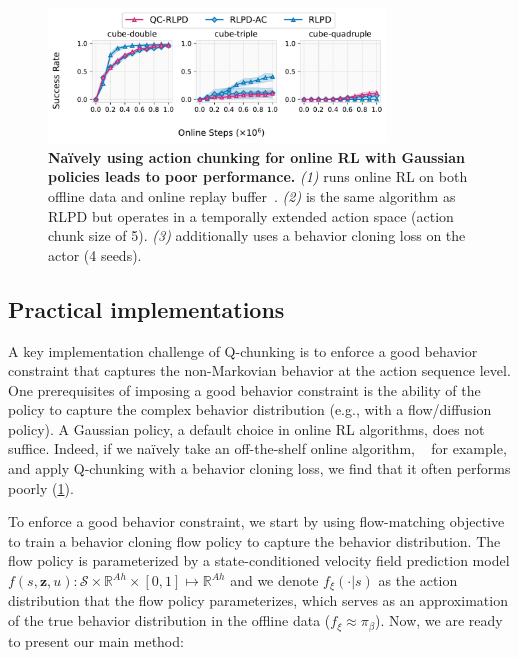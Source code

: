 \begin{figure}[t]
\centering
\includegraphics[width=0.8\textwidth]{figures/rlpd-qc-all.pdf}  %
\vspace{-0.7em}
\caption{\footnotesize \textbf{Na\"ively using action chunking for online RL with Gaussian policies leads to poor performance.} \emph{(1)}  runs online RL on both offline data and online replay buffer~\citep{ball2023efficient}. \emph{(2)}  is the same algorithm as RLPD but operates in a temporally extended action space (action chunk size of 5). \emph{(3)}  additionally uses a behavior cloning loss on the actor (4 seeds). }
\vspace{-1em}
\label{fig:rlpd-all}
\end{figure}

\subsection{Practical implementations}
A key implementation challenge of Q-chunking is to enforce a good behavior constraint that captures the non-Markovian behavior at the action sequence level. One prerequisites of imposing a good behavior constraint is the ability of the policy to capture the complex behavior distribution (e.g., with a flow/diffusion policy). A Gaussian policy, a default choice in online RL algorithms, does not suffice. Indeed, if we na\"ively take an off-the-shelf online algorithm, ~\citep{ball2023efficient} for example, and apply Q-chunking with a behavior cloning loss, we find that it often performs poorly (\cref{fig:rlpd-all}). 

To enforce a good behavior constraint, we start by using flow-matching objective~\citep{liu2022flow} to train a behavior cloning flow policy to capture the behavior distribution. The flow policy is parameterized by a state-conditioned velocity field prediction model $f(s, \mathbf z, u): \mathcal{S} \times \mathbb{R}^{Ah} \times [0, 1] \mapsto \mathbb{R}^{Ah}$ and we denote $f_\xi(\cdot | s)$ as the action distribution that the flow policy parameterizes, which serves as an approximation of the true behavior distribution in the offline data ($f_\xi \approx \pi_\beta$). Now, we are ready to present our main method:

